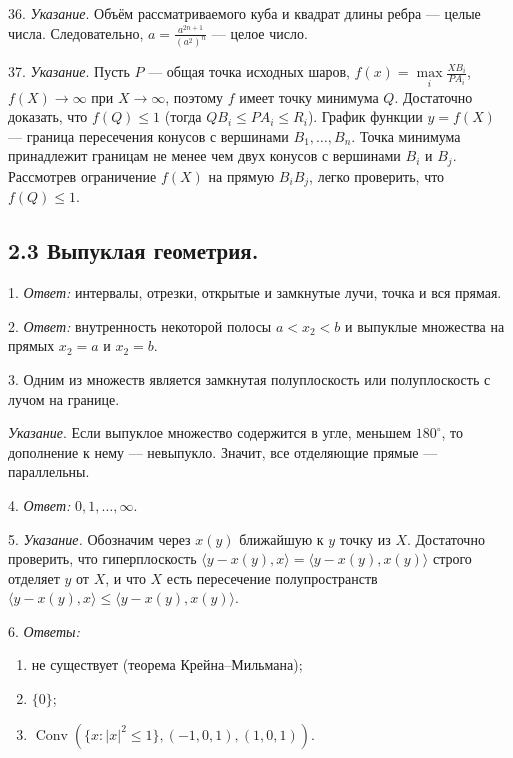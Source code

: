 	36. \textit{Указание}. Объём рассматриваемого куба и квадрат длины ребра — целые числа. Следовательно, $a = \frac{a^{2n+1}}{(a^2)^n} $ — целое число.

	37. \textit{Указание}. Пусть $P$ — общая точка исходных шаров, $f(x) = \max\limits_i \frac{X B_i}{P A_i}$, $f(X) \to \infty$ при $X \to \infty$, поэтому $f$ имеет точку минимума $Q$. Достаточно доказать, что $f(Q) \le 1$ (тогда $Q B_i \le P A_i \le R_i$). График функции $y = f(X)$ — граница пересечения конусов с вершинами $B_1,\dots,B_n$. Точка минимума принадлежит границам не менее чем двух конусов с вершинами $B_i$ и $B_j$. Рассмотрев ограничение $f(X)$ на прямую $B_i B_j$, легко проверить, что $f(Q) \le 1$.

	\subsection{2.3 Выпуклая геометрия.}

	1. \textit{Ответ:} интервалы, отрезки, открытые и замкнутые лучи, точка и вся прямая.

	2. \textit{Ответ:} внутренность некоторой полосы $a < x_2 < b$ и выпуклые множества на прямых $x_2 = a$ и $x_2 = b$.

	3. Одним из множеств является замкнутая полуплоскость или полуплоскость с лучом на границе.  

	\textit{Указание}. Если выпуклое множество содержится в угле, меньшем $180^\circ$, то дополнение к нему — невыпукло. Значит, все отделяющие прямые — параллельны.

	4. \textit{Ответ:} $0,1,\dots,\infty$.

	5. \textit{Указание.} Обозначим через $x(y)$ ближайшую к $y$ точку из $X$. Достаточно проверить, что гиперплоскость $\langle y - x(y), x \rangle = \langle y - x(y), x(y) \rangle$ строго отделяет $y$ от $X$, и что $X$ есть пересечение полупространств $\langle y - x(y), x \rangle \le \langle y - x(y), x(y) \rangle$.

	6. \textit{Ответы:}  
	\begin{enumerate}[label=\asbuk*)]
		\item не существует (теорема Крейна–Мильмана);  
		\item $\{0\}$;  
		\item $\operatorname{Conv}\left(\{x : |x|^2 \le 1\}, (-1,0,1), (1,0,1)\right)$.
	\end{enumerate}

